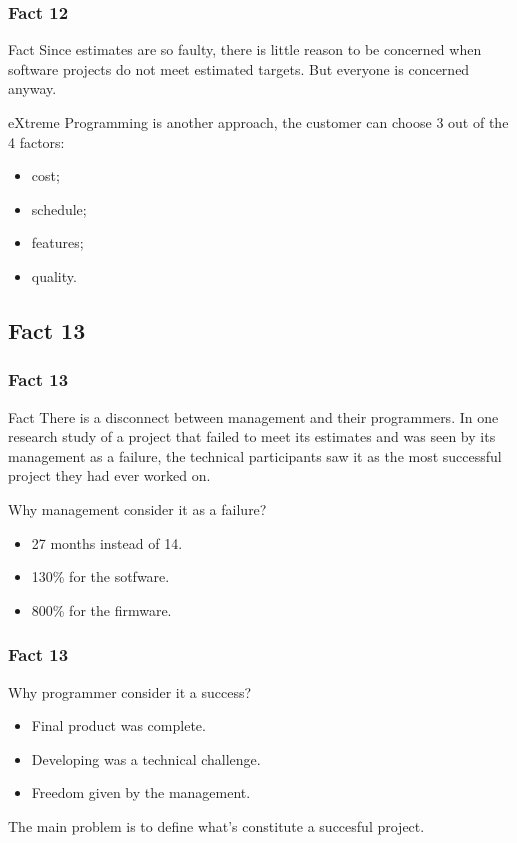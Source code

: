 \documentclass{beamer}
\begin{document}
\begin{frame}
    \frametitle{Fact 12}
    \begin{block}{Fact}
    Since estimates are so faulty, there is little reason to be concerned when
    software projects do not meet estimated targets. But everyone is concerned
    anyway.
    \end{block}

    eXtreme Programming is another approach, the customer can choose 3 out of the
    4 factors:
    \begin{itemize}
        \item cost;
        \pause
        \item schedule;
        \pause
        \item features;
        \pause
        \item quality.
    \end{itemize}
\end{frame}

\subsection{Fact 13}
\begin{frame}
    \frametitle{Fact 13}
    \begin{block}{Fact}
    There is a disconnect between management and their programmers. In one
    research study of a project that failed to meet its estimates and was seen
    by its management as a failure, the technical participants saw it as the
    most successful project they had ever worked on.
    \end{block}
    Why management consider it as a failure?
    \begin{itemize}
    	\item 27 months instead of 14.
    	\item 130\% for the sotfware.
    	\item 800\% for the firmware.
    \end{itemize}
\end{frame}

\begin{frame}
	\frametitle{Fact 13}
	Why programmer consider it a success?
	\begin{itemize}
		\item Final product was complete.
		\item Developing was a technical challenge.
		\item Freedom given by the management.
	\end{itemize}
	The main problem is to define what's constitute a succesful project.
\end{frame}
\end{document}
